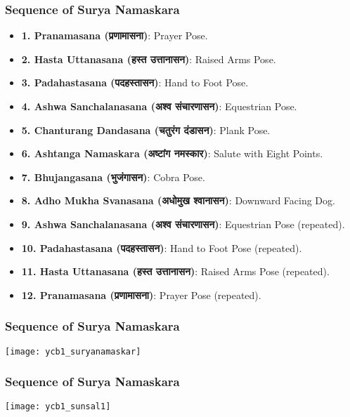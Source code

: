 \begin{frame}[fragile]\frametitle{Sequence of Surya Namaskara}

      \begin{itemize}
        \item \textbf{1. Pranamasana (प्रणामासना)}: Prayer Pose.
        \item \textbf{2. Hasta Uttanasana (हस्त उत्तानासन)}: Raised Arms Pose.
        \item \textbf{3. Padahastasana (पदहस्तासन)}: Hand to Foot Pose.
        \item \textbf{4. Ashwa Sanchalanasana (अश्व संचारणासन)}: Equestrian Pose.
        \item \textbf{5. Chanturang Dandasana (चतुरंग दंडासन)}: Plank Pose.
        \item \textbf{6. Ashtanga Namaskara (अष्टांग नमस्कार)}: Salute with Eight Points.
        \item \textbf{7. Bhujangasana (भुजंगासन)}: Cobra Pose.
        \item \textbf{8. Adho Mukha Svanasana (अधोमुख श्वानासन)}: Downward Facing Dog.
        \item \textbf{9. Ashwa Sanchalanasana (अश्व संचारणासन)}: Equestrian Pose (repeated).
        \item \textbf{10. Padahastasana (पदहस्तासन)}: Hand to Foot Pose (repeated).
        \item \textbf{11. Hasta Uttanasana (हस्त उत्तानासन)}: Raised Arms Pose (repeated).
        \item \textbf{12. Pranamasana (प्रणामासना)}: Prayer Pose (repeated).
      \end{itemize}
 
\end{frame}


\begin{frame}[fragile]\frametitle{Sequence of Surya Namaskara}

        \begin{center}
        \texttt{[image: ycb1\_suryanamaskar]}
        \end{center}	

\end{frame}

\begin{frame}[fragile]\frametitle{Sequence of Surya Namaskara}

        \begin{center}
        \texttt{[image: ycb1\_sunsal1]}
		
        \end{center}	
		

\end{frame}

